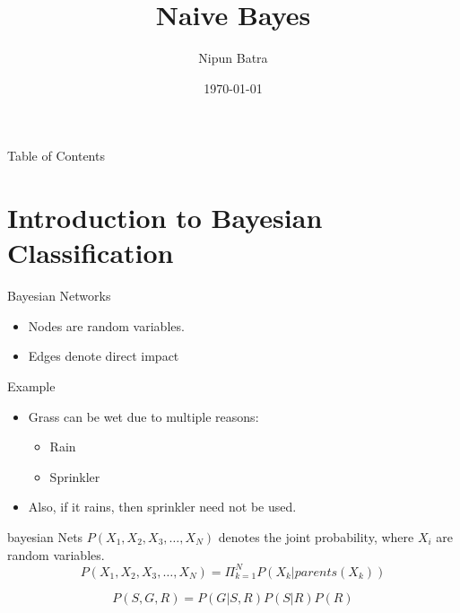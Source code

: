 \documentclass{beamer}
\title{Naive Bayes}
\date{\today}
\author{Nipun Batra}
\institute{IIT Gandhinagar}
\begin{document}
\maketitle

\begin{frame}{Table of Contents}
\tableofcontents
\end{frame}

\section{Introduction to Bayesian Classification}

\begin{frame}{Bayesian Networks}
\begin{itemize}
	
	
	\item Nodes are random variables.
	\item Edges denote direct impact

	
\end{itemize}
\end{frame}

\begin{frame}{Example}
\begin{itemize}

\item Grass can be wet due to multiple reasons:
\begin{itemize}
    \item Rain
    \item Sprinkler
\end{itemize}
\item Also, if it rains, then sprinkler need not be used.
\end{itemize}

    


	

\end{frame}

\begin{frame}{bayesian Nets}
    $P(X_{1},X_{2},X_{3},\dots,X_{N})$ denotes the joint probability, where $X_{i}$ are random variables.
    \begin{equation*}
        P(X_{1},X_{2},X_{3},\dots,X_{N}) = \Pi_{k=1}^{N} P(X_{k} | parents(X_{k}))
    \end{equation*}
    
    
    \begin{equation*}
        P(S,G,R) =  P(G|S,R)P(S|R)P(R)
    \end{equation*}
    
\end{frame}
\end{document}
